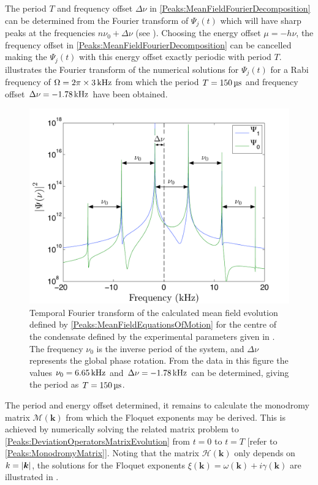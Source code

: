 The period $T$ and frequency offset $\Delta\nu$ in \eqref{Peaks:MeanFieldFourierDecomposition} can be determined from the Fourier transform of $\Psi_j(t)$ which will have sharp peaks at the frequencies $n \nu_0 + \Delta \nu$ (see ). Choosing the energy offset $\mu=-h \nu$, the frequency offset in \eqref{Peaks:MeanFieldFourierDecomposition} can be cancelled making the $\Psi_j(t)$ with this energy offset exactly periodic with period $T$.  illustrates the Fourier transform of the numerical solutions for $\Psi_j(t)$ for a Rabi frequency of $\Omega = 2 \pi \times \unit[3]{kHz}$ from which the period $T=\unit[150]{\micro{}s}$ and frequency offset $\Delta \nu = \unit[-1.78]{kHz}$ have been obtained.

\begin{figure}
    \centering
    \includegraphics[width=14cm]{MeanFieldFourierTransform}
    \caption{Temporal Fourier transform of the calculated mean field evolution defined by \eqref{Peaks:MeanFieldEquationsOfMotion} for the centre of the condensate defined by the experimental parameters given in . The frequency $\nu_0$ is the inverse period of the system, and $\Delta\nu$ represents the global phase rotation. From the data in this figure the values $\nu_0 = \unit[6.65]{kHz}$ and $\Delta\nu = \unit[-1.78]{kHz}$ can be determined, giving the period as $T=\unit[150]{\micro{}s}$. \label{Peaks:MeanFieldFourierTransform}}
\end{figure}

The period and energy offset determined, it remains to calculate the mono\-dromy matrix $\mathcal{M}(\bm{k})$ from which the Floquet exponents may be derived. This is achieved by numerically solving the related matrix problem to \eqref{Peaks:DeviationOperatorsMatrixEvolution} from $t=0$ to $t=T$ [refer to \eqref{Peaks:MonodromyMatrix}]. Noting that the matrix $\mathcal{H}(\bm{k})$ only depends on $k = \left|\bm{k}\right|$, the solutions for the Floquet exponents $\xi(\bm{k}) = \omega(\bm{k}) + i\gamma(\bm{k})$ are illustrated in .

